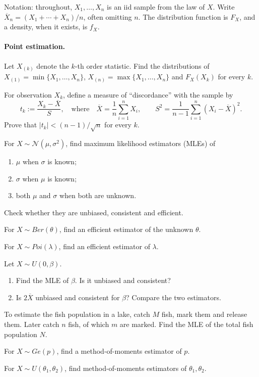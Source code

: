 \documentclass[a4paper]{report}
\begin{document}
Notation: throughout, $X_1,\dots,X_n$ is an iid sample from the law of $X$. Write $\overline X_n=(X_1+\cdots+X_n)/n$, often omitting $n$. The distribution function is $F_X$, and a density, when it exists, is $f_X$.
\paragraph{Point estimation.}
\begin{problem}
Let $X_{(k)}$ denote the $k$-th order statistic. Find the distributions of $X_{(1)}=\min\{X_1,\dots,X_n\}$, $X_{(n)}=\max\{X_1,\dots,X_n\}$ and $F_X(X_k)$ for every $k$.
\end{problem}
\begin{problem}
For observation $X_k$, define a measure of ``discordance'' with the sample by
\[t_k:=\frac{X_k-\overline X}{S},\quad\text{where}\quad\overline X=\frac1n\sum_{i=1}^nX_i,\qquad S^2=\frac1{n-1}\sum_{i=1}^n(X_i-\overline X)^2.\]
Prove that $|t_k|<(n-1)/\sqrt n$ for every $k$.
\end{problem}
\begin{problem}
For $X\sim\mathcal N(\mu,\sigma^2)$, find maximum likelihood estimators (MLEs) of
\begin{enumerate}\item $\mu$ when $\sigma$ is known;\item $\sigma$ when $\mu$ is known;\item both $\mu$ and $\sigma$ when both are unknown.\end{enumerate}
Check whether they are unbiased, consistent and efficient.
\end{problem}
\begin{problem}For $X\sim Ber(\theta)$, find an efficient estimator of the unknown $\theta$.\end{problem}
\begin{problem}For $X\sim Poi(\lambda)$, find an efficient estimator of $\lambda$.\end{problem}
\begin{problem}
Let $X\sim U(0,\beta)$.
\begin{enumerate}
\item Find the MLE of $\beta$. Is it unbiased and consistent?
\item Is $2\overline X$ unbiased and consistent for $\beta$? Compare the two estimators.
\end{enumerate}
\end{problem}
\begin{problem}
To estimate the fish population in a lake, catch $M$ fish, mark them and release them. Later catch $n$ fish, of which $m$ are marked. Find the MLE of the total fish population $N$.
\end{problem}
\begin{problem}For $X\sim Ge(p)$, find a method-of-moments estimator of $p$.\end{problem}
\begin{problem}For $X\sim U(\theta_1,\theta_2)$, find method-of-moments estimators of $\theta_1,\theta_2$.\end{problem}
\end{document}
